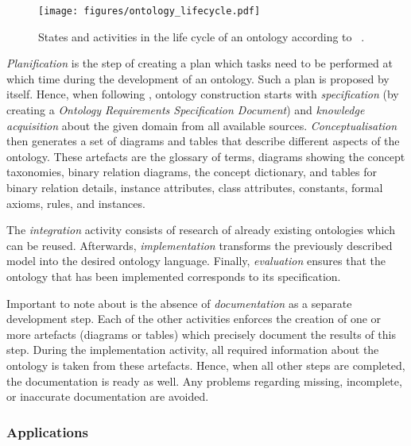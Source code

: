 \begin{figure}
  \texttt{[image: figures/ontology\_lifecycle.pdf]}
  \caption[States and activities proposed by \methontology]{States and activities in the life cycle of an ontology according to \methontology~\cite{Methontology}.}
  \label{fig:methontology1}
\end{figure}

\emph{Planification} is the step of creating a plan which tasks need to be performed at which time during the development of an ontology. Such a plan is proposed by \methontology itself. Hence, when following \methontology, ontology construction starts with \emph{specification} (by creating a \emph{Ontology Requirements Specification Document}) and \emph{knowledge acquisition} about the given domain from all available sources. \emph{Conceptualisation} then generates a set of diagrams and tables that describe different aspects of the ontology. These artefacts are the glossary of terms, diagrams showing the concept taxonomies, binary relation diagrams, the concept dictionary, and tables for binary relation details, instance attributes, class attributes, constants, formal axioms, rules, and instances.

The \emph{integration} activity consists of research of already existing ontologies which can be reused. Afterwards, \emph{implementation} transforms the previously described model into the desired ontology language. Finally, \emph{evaluation} ensures that the ontology that has been implemented corresponds to its specification.

Important to note about \methontology is the absence of \emph{documentation} as a separate development step. Each of the other activities enforces the creation of one or more artefacts (diagrams or tables) which precisely document the results of this step. During the implementation activity, all required information about the ontology is taken from these artefacts. Hence, when all other steps are completed, the documentation is ready as well. Any problems regarding missing, incomplete, or inaccurate documentation are avoided.

\subsubsection{Applications}


